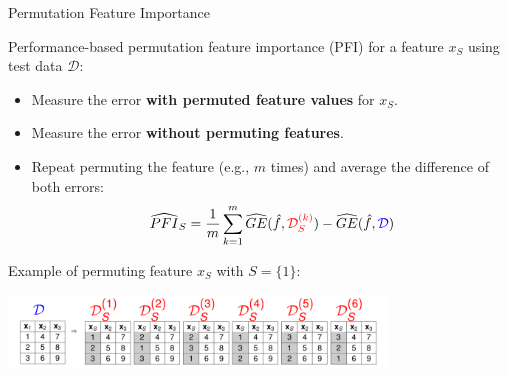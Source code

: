 \documentclass[aspectratio=169]{../latex_main/tntbeamer}  %
\begin{document}
\begin{frame}{Permutation Feature Importance}

Performance-based permutation feature importance (PFI) for a feature $x_S$ using test data $\mathcal{D}$:
\begin{itemize}
  \item Measure the error \color{red}\textbf{with permuted feature values} \color{black} for $x_S$.
  \item Measure the error \color{blue}\textbf{without permuting features}\color{black}.
  \item Repeat permuting the feature (e.g., $m$ times) and average the difference of both errors: 
$$\widehat{PFI}_S = \frac{1}{m} \sum_{k = 1}^{m} \widehat{GE}(\hat{f}, {\color{red}\mathcal{D}_{S}^{(k)}}) - \widehat{GE}(\hat{f}, {\color{blue}\mathcal{D}})$$
\end{itemize}

Example of permuting feature $x_S$ with $S = \{1\}$:

\begin{center}
\includegraphics[width=0.75\textwidth]{figure/permuted-fv.png}
\end{center}


\end{frame}
\end{document}
